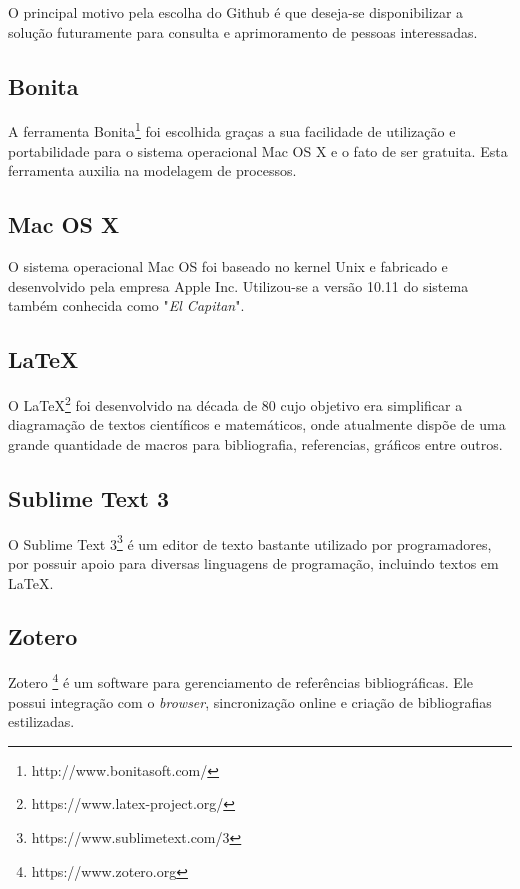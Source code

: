 	 O principal motivo pela escolha do Github é que deseja-se disponibilizar a solução futuramente para consulta e aprimoramento de pessoas interessadas. 		

	\subsection{Bonita} %
	\label{sub:Bonita}
		 A ferramenta Bonita\footnote{http://www.bonitasoft.com/} foi escolhida graças a sua facilidade de utilização e portabilidade para o sistema operacional Mac OS X e o fato de ser gratuita. Esta ferramenta auxilia na modelagem de processos.

	\subsection{Mac OS X} %
	\label{sub:Mac OS X}
		O sistema operacional Mac OS foi baseado no kernel Unix e fabricado e desenvolvido pela empresa Apple Inc. Utilizou-se a versão 10.11 do sistema também conhecida como "\textit{El Capitan}".

	\subsection{LaTeX} %
	\label{sub:latex}
	
	O LaTeX\footnote{https://www.latex-project.org/} foi desenvolvido na década de 80 cujo objetivo era simplificar a diagramação de textos científicos e matemáticos, onde atualmente dispõe de uma grande quantidade de macros para bibliografia, referencias, gráficos entre outros.

	\subsection{Sublime Text 3} %
	\label{sub:sublime_text_3}
		O Sublime Text 3\footnote{https://www.sublimetext.com/3} é um editor de texto bastante utilizado por programadores, por possuir apoio para diversas linguagens de programação, incluindo textos em LaTeX.

	\subsection{Zotero} %
	\label{sub:zotero}
		Zotero \footnote{https://www.zotero.org} é um software para gerenciamento de referências bibliográficas. Ele possui integração com o \textit{browser}, sincronização online e criação de bibliografias estilizadas.
	
